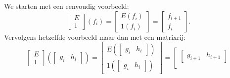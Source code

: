 \documentclass[a4paper,12pt]{article}
\begin{document}
\begin{example}[matrixoperatoren]
    We starten met een eenvoudig voorbeeld:
    \[
        \left[ {
                    \begin{array}{c}
                        E \\
                        1
                    \end{array} } \right]
        (f_i) =
        \left[ {
                    \begin{array}{c}
                        E(f_i) \\
                        1(f_i)
                    \end{array} } \right]
        =
        \left[ {
                    \begin{array}{c}
                        f_{i+1} \\
                        f_i
                    \end{array} } \right].
    \]
    Vervolgens hetzelfde voorbeeld maar dan met een matrixrij:
    \[
        \left[ {
                    \begin{array}{c}
                        E \\
                        1
                    \end{array} } \right]
        \left(\left[ {
            \begin{array}{cc}
                g_i & h_i
            \end{array} } \right]\right) =
        \left[ {
                    \begin{array}{r}
                        E \left(\left[ {
                        \begin{array}{cc}
                                g_i & h_i
                            \end{array} } \right]\right) \\
                        1\left(\left[ {
                            \begin{array}{cc}
                                g_i & h_i
                            \end{array} } \right]\right)
                    \end{array} } \right]
        =
        \left[ {
                    \begin{array}{c}
                        \left[ {
                        \begin{array}{cc}
                                        g_{i+1} & h_{i+1}
                                    \end{array} } \right] \\

\end{array}}\]
\end{example}
\end{document}
